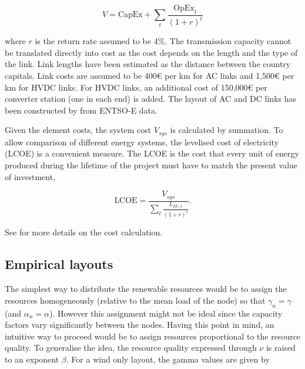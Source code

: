 \documentclass[a4paper, 12pt, sort&compress]{elsarticle}%
\newcommand{\paren}[1]{\left(#1\right)}
\begin{document}
\begin{equation}
  \label{eq:6}
  V = \text{CapEx} + \sum_{t} \frac{\text{OpEx}_{t}}{\paren{1 + r}^{t}}
\end{equation}

where $r$ is the return rate assumed to be 4\%. The transmission
capacity cannot be translated directly into cost as the cost depends
on the length and the type of the link. Link lengths have been
estimated as the distance between the country capitals. Link costs are
assumed to be 400\euro{}
per km for AC links and 1,500\euro{}
per km for HVDC links. For HVDC links, an additional cost of
150,000\euro{}
per converter station (one in each end) is
added\cite{McKinsey, Schaber, Schaber2}. The layout of AC and
DC links has been constructed by \cite{Rolando} from ENTSO-E data.


Given the element costs, the system cost $V_{sys}$ is calculated by
summation. To allow comparison of different energy systems, the
levelised cost of electricity (LCOE) is a convenient measure. The LCOE
is the cost that every unit of energy produced during the lifetime of
the project must have to match the present value of
investment\cite{Short1995},

\begin{equation}
  \label{eq:7}
  \text{LCOE} = \frac{V_{sys}}{\sum_{t} \frac{L_{EU,
        t}}{\paren{1+r}^{t}}} .
\end{equation}

See \cite{Sensitivity} for more details on the cost calculation.

\subsection{Empirical layouts}
\label{sec:empirical-layouts}

The simplest way to distribute the renewable resources would be to
assign the resources homogeneously (relative to the mean load of the
node) so that $\gamma_{n} = \gamma$ (and $\alpha_{n} = \alpha$). However this assignment
might not be ideal since the capacity factors vary significantly
between the nodes. Having this point in mind, an intuitive way to
proceed would be to assign resources proportional to the resource
quality. To generalise the idea, the resource quality expressed
through $\nu$ is raised to an exponent $\beta$. For a wind only layout, the
gamma values are given by
\end{document}
